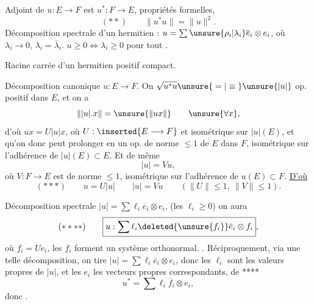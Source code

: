 Adjoint de $u:E\longrightarrow F$ est $u^*:F\longrightarrow E$, propriétés formelles, 
\[
(**)\qquad \boxed{\|u^*u\|=\|u\|^2}.
\]
Décomposition spectrale d'un hermitien  : $u=\sum\unsure{\rho_i|\lambda_i}\overline e_i\otimes e_i$, où $\lambda_i\longrightarrow0$, $\lambda_i=\overline\lambda_i$.  $u\geq0\Longleftrightarrow\lambda_i\geq0$ pour tout .

Racine carrée d'un  hermitien positif compact.

Décomposition canonique   $u:E\longrightarrow F$.
On   $\sqrt{u^*u}\unsure{{}={}|{}\equiv{}}\unsure{|u|}$ op. positif dans $E$, et on a
\[
\||u|.x\|=\unsure{\|ux\|}\qquad\unsure{\forall x},
\]
d'où $ux=U|u|x$, où $U:\inserted{E\longrightarrow F}$  et isométrique sur $|u|(E)$, et qu'on donc peut prolonger en un op. de norme $\leq1$ de $E$ dans $F$, isométrique sur  l'adhérence de  $|u|(E)\subset E$. Et de même
\[
|u|=Vu,
\]
où $V:F\longrightarrow E$ est de norme $\leq1$, isométrique sur l'adhérence de $u(E)\subset F$. \uline{D'où}
\[
(***)\qquad\boxed{u=U|u|\qquad |u|=Vu}\qquad(\|U\|\leq1,\ \|V\|\leq1).
\]


Décomposition spectrale  $|u|=\sum\ell_i\overline e_i\otimes e_i$, (les $\ell_i\geq0$)
on aura
\[
(****)\qquad\boxed{u:\sum\ell_i\deleted{\unsure{f_i}}\overline e_i\otimes f_i},
\]
où $f_i=Ue_i$, les $f_i$ forment un système orthonormal. 
.
Réciproquement, via une telle décomposition, on tire $|u|=\sum\ell_i\overline e_i\otimes e_i$, donc les $\ell_i$ sont les valeurs propres de $|u|$, et les $e_i$ les vecteurs propres correspondants,  de ****
\[
u^*=\sum\ell_i\overline f_i\otimes e_i,
\]
donc . 

